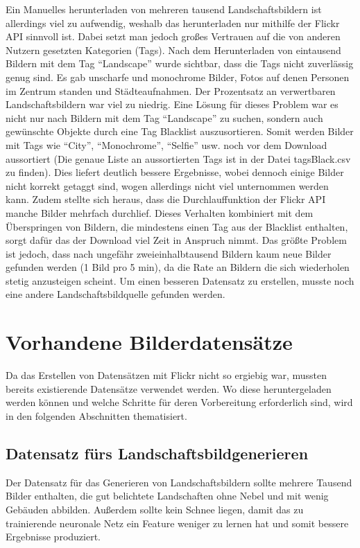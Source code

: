 Ein Manuelles herunterladen von mehreren tausend Landschaftsbildern ist allerdings viel zu aufwendig, weshalb das herunterladen nur mithilfe der Flickr API sinnvoll ist. Dabei setzt man jedoch großes Vertrauen auf die von anderen Nutzern gesetzten Kategorien (Tags). Nach dem Herunterladen von eintausend Bildern mit dem Tag \enquote{Landscape} wurde sichtbar, dass die Tags nicht zuverlässig genug sind. Es gab unscharfe und monochrome Bilder, Fotos auf denen Personen im Zentrum standen und Städteaufnahmen. Der Prozentsatz an verwertbaren Landschaftsbildern war viel zu niedrig. Eine Lösung für dieses Problem war es nicht nur nach Bildern mit dem Tag  \enquote{Landscape} zu suchen, sondern auch gewünschte Objekte durch eine Tag Blacklist auszusortieren. Somit werden Bilder mit Tags wie \enquote{City}, \enquote{Monochrome}, \enquote{Selfie} usw. noch vor dem Download aussortiert (Die genaue Liste an aussortierten Tags ist in der Datei tagsBlack.csv zu finden). Dies liefert deutlich bessere Ergebnisse, wobei dennoch einige Bilder nicht korrekt getaggt sind, wogen allerdings nicht viel unternommen werden kann. Zudem stellte sich heraus, dass die Durchlauffunktion der Flickr API manche Bilder mehrfach durchlief. Dieses Verhalten kombiniert mit dem Überspringen von Bildern, die mindestens einen Tag aus der Blacklist enthalten, sorgt dafür das der Download viel Zeit in Anspruch nimmt. Das größte Problem ist jedoch, dass nach ungefähr zweieinhalbtausend Bildern kaum neue Bilder gefunden werden (1 Bild pro 5 min), da die Rate an Bildern die sich wiederholen stetig anzusteigen scheint. Um einen besseren Datensatz zu erstellen, musste noch eine andere Landschaftsbildquelle gefunden werden.

\section{Vorhandene Bilderdatensätze}%

Da das Erstellen von Datensätzen mit Flickr nicht so ergiebig war, mussten bereits existierende Datensätze verwendet werden. Wo diese heruntergeladen werden können und welche Schritte für deren Vorbereitung erforderlich sind, wird in den folgenden Abschnitten thematisiert. 

\subsection{Datensatz fürs Landschaftsbildgenerieren}

Der Datensatz für das Generieren von Landschaftsbildern sollte mehrere Tausend Bilder enthalten, die gut belichtete Landschaften ohne Nebel und mit wenig Gebäuden abbilden. Außerdem sollte kein Schnee liegen, damit das zu trainierende neuronale Netz ein Feature weniger zu lernen hat und somit bessere Ergebnisse produziert.

